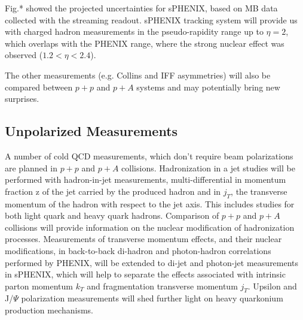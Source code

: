 Fig.* showed the projected uncertainties for sPHENIX, based on MB data collected with the streaming readout. sPHENIX tracking system will provide us with charged hadron measurements in the pseudo-rapidity range up to $\eta=2$, which overlaps with the PHENIX range, where the strong nuclear effect was observed ($1.2<\eta<2.4$).

The other measurements (e.g. Collins and IFF asymmetries) will also be compared between $p+p$ and $p+A$ systems and may potentially bring new surprises.

\subsection {Unpolarized Measurements}

A number of cold QCD measurements, which don't require beam polarizations are planned in $p+p$ and $p+A$ collisions. Hadronization in a jet studies will be performed with hadron-in-jet measurements, multi-differential in momentum fraction z of the jet carried by the produced hadron and in $j_T$, the transverse momentum of the hadron with respect to the jet axis. This includes studies for both light quark and heavy quark hadrons. Comparison of $p+p$ and $p+A$ collisions will provide information on the nuclear modification of hadronization processes. Measurements of transverse momentum effects, and their nuclear modifications, in back-to-back di-hadron and photon-hadron correlations performed by PHENIX, will be extended to di-jet and photon-jet measurements in sPHENIX, which will help to separate the effects associated with intrinsic parton momentum $k_T$ and fragmentation transverse momentum $j_T$. Upsilon and J/$\Psi$ polarization measurements will shed further light on heavy quarkonium production mechanisms.

